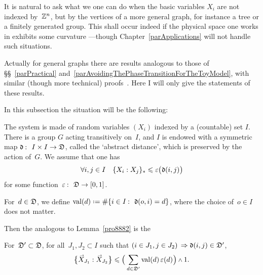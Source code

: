 It is natural to ask what we one can do
when the basic variables $X_i$ are not indexed by~$\mathbb{Z}^n$,
but by the vertices of a more general graph,
for instance a tree or a finitely generated group.
This shall occur indeed if the physical space one works in
exhibits some curvature%
—though Chapter~\ref{parApplications} will not handle such situations.

Actually for general graphs there are results analogous to those of
\S\S~\ref{parPractical} and~\ref{parAvoidingThePhaseTransitionForTheToyModel},
with similar (though more technical) proofs~\cite{perso}.
Here I will only give the statements of these results.

In this subsection the situation will be the following:
%
\begin{Hyp}\label{hypNF}
The system is made of random variables $(X_i)$ indexed by a (countable) set $I$.
There is a group $G$ acting transitively on~$I$,
and $I$ is endowed with a symmetric map $\mfrak{d} \colon {I\times I}\to\mfrak{D}$,
called the `abstract distance', which is preserved by the action of~$G$.
We assume that one has
\[ \forall i,j\in I \quad \{X_i:X_j\}_{*} \leq \epsilon\big(\mfrak{d}(i,j)\big) \]
for some function~$\epsilon \colon \mfrak{D} \to [0,1]$.
\end{Hyp}

\begin{Def}
For~$d\in\mathfrak{D}$, we define $\valency(d) \coloneqq \# \{ i\in I \colon \mfrak{d}(o,i) = d \}$,
where the choice of~$o\in I$ does not matter.
\end{Def}

Then the analogous to Lemma~\ref{pro8882} is the
%
\begin{Lem}\label{pro8882+}
For~$\mathfrak{D}'\subset\mathfrak{D}$, for all~$J_1,J_2\subset I$ such that
$(i\in J_1,j\in J_2)\,\Rightarrow \mfrak{d}(i,j) \ab \in \nolinebreak[2] \mfrak{D}'$,
\[ \big\{\vec{X}_{J_1} : \vec{X}_{J_2}\big\} \leq
\Big( \sum_{d\in \mfrak{D}'} \valency(d)\,\epsilon(d) \Big) \wedge 1 .\]
\end{Lem}


